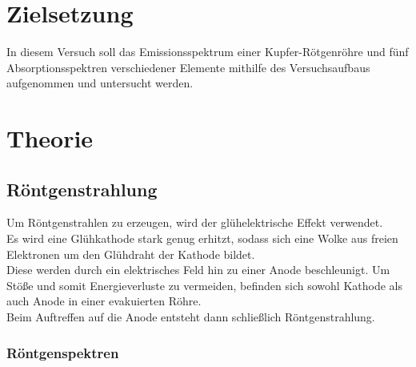 \section{Zielsetzung}
\label{sec:Zielsetzung}

In diesem Versuch soll das Emissionsspektrum einer Kupfer-Rötgenröhre und 
fünf Absorptionsspektren verschiedener Elemente mithilfe des Versuchsaufbaus
aufgenommen und untersucht werden.

\section{Theorie}
\label{sec:Theorie}

\subsection{Röntgenstrahlung}

Um Röntgenstrahlen zu erzeugen, wird der glühelektrische Effekt verwendet.\\
Es wird eine Glühkathode stark genug erhitzt, sodass sich eine Wolke aus freien
Elektronen um den Glühdraht der Kathode bildet.\\
Diese werden durch ein elektrisches Feld hin zu einer Anode beschleunigt.
Um Stöße und somit Energieverluste zu vermeiden, befinden sich sowohl Kathode
als auch Anode in einer evakuierten Röhre.\\
Beim Auftreffen auf die Anode entsteht dann schließlich Röntgenstrahlung.\\

\subsubsection{Röntgenspektren}

